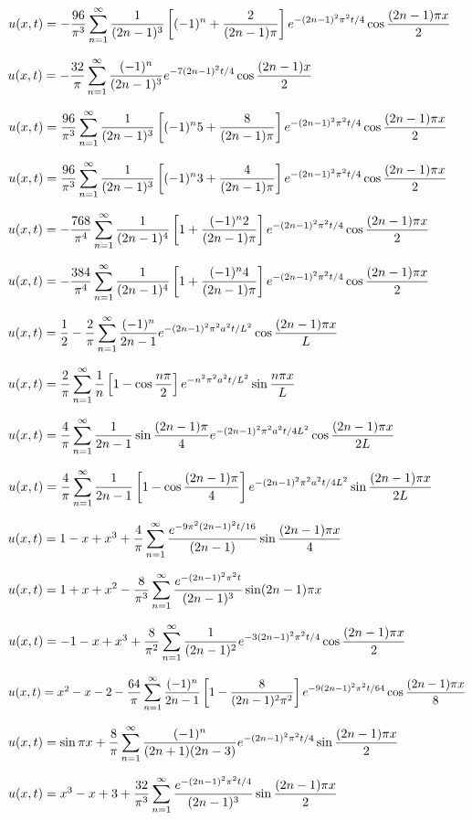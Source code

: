 $u(x,t)=-\displaystyle\frac{96}{\pi^{3}}\sum_{n=1}^{\infty}\frac{1}{(2n-1)^{3}}\left[
(-1)^{n}+\frac{2}{(2n-1)\pi}\right]e^{-(2n-1)^{2}\pi^{2}t/4}\cos\frac{(2n-1)\pi
x}{2}$

$u(x,t)=-\displaystyle
\frac{32}{\pi}\sum_{n=1}^{\infty}\frac{(-1)^{n}}{(2n-1)^{3}}e^{-7(2n-1)^{2}t/4}\cos\frac{(2n-1)x}{2}$

$u(x,t)=\displaystyle\frac{96}{\pi^{3}}\sum_{n=1}^{\infty}\frac{1}{(2n-1)^{3}}\left[
(-1)^{n}5+\frac{8}{(2n-1)\pi}\right]e^{-(2n-1)^{2}\pi^{2}t/4}\cos\frac{(2n-1)\pi
x}{2}$

$u(x,t)=\displaystyle\frac{96}{\pi^{3}}\sum_{n=1}^{\infty}\frac{1}{(2n-1)^{3}}\left[
(-1)^{n}3+\frac{4}{(2n-1)\pi}\right]e^{-(2n-1)^{2}\pi^{2}t/4}\cos\frac{(2n-1)\pi
x}{2}$

$u(x,t)=-\displaystyle\frac{768}{\pi^{4}}\sum_{n=1}^{\infty}\frac{1}{(2n-1)^{4}}\left[
1+\frac{(-1)^{n}2}{(2n-1)\pi}\right]e^{-(2n-1)^{2}\pi^{2}t/4}\cos\frac{(2n-1)\pi
x}{2}$

$u(x,t)=-\displaystyle\frac{384}{\pi^{4}}\sum_{n=1}^{\infty}\frac{1}{(2n-1)^{4}}\left[
1+\frac{(-1)^{n}4}{(2n-1)\pi}\right]e^{-(2n-1)^{2}\pi^{2}t/4}\cos\frac{(2n-1)\pi
x}{2}$

$u(x,t)=\displaystyle\frac{1}{2}-\frac{2}{\pi}\sum_{n=1}^{\infty}
\frac{(-1)^{n}}{2n-1}e^{-(2n-1)^{2}\pi^{2}a^{2}t/L^{2}}\cos\frac{(2n-1)\pi x}{L}$

$u(x,t)=\displaystyle\frac{2}{\pi}\sum_{n=1}^{\infty}\frac{1}{n}
\left[1-\cos\frac{n\pi}{2}\right]e^{-n^{2}\pi^{2}a^{2}t/L^{2}}\sin\frac{n\pi x}{L}$

$u(x,t)=\displaystyle\frac{4}{\pi}\sum_{n=1}^{\infty}\frac{1}{2n-1}\sin\frac{(2n-1)\pi}{4}
e^{-(2n-1)^{2}\pi^{2}a^{2}t/4L^{2}}\cos\frac{(2n-1)\pi x}{2L}$

$u(x,t)=\displaystyle\frac{4}{\pi}\sum_{n=1}^{\infty}\frac{1}{2n-1}
\left[1-\cos\frac{(2n-1)\pi}{4}\right]
e^{-(2n-1)^{2}\pi^{2}a^{2}t/4L^{2}}\sin\frac{(2n-1)\pi x}{2L}$

$u(x,t)=1-x+x^{3}+\displaystyle\frac{4}{\pi}\sum_{n=1}^{\infty}\frac{e^{-9\pi^{2}(2n-1)^{2}t/16}}{(2n-1)}
\sin\frac{(2n-1)\pi x}{4}$

$u(x,t)=\displaystyle1+x+x^{2}
-\displaystyle\frac{8}{\pi^{3}}\sum_{n=1}^{\infty}
\frac{e^{-(2n-1)^{2}\pi^{2}t}}{(2n-1)^{3}}
\sin(2n-1)\pi x$

$u(x,t)=-1-x+x^{3}+
\displaystyle\frac{8}{\pi^{2}}\sum_{n=1}^{\infty}\frac{1}{(2n-1)^{2}}
e^{-3(2n-1)^{2}\pi^{2}t/4}
\cos\frac{(2n-1)\pi x}{2}$

$u(x,t)=x^{2}-x-2\displaystyle-\frac{64}{\pi}\sum_{n=1}^{\infty}\frac{(-1)^{n}}{2n-1}\left[
1-\frac{8}{(2n-1)^{2}\pi^{2}}\right]e^{-9(2n-1)^{2}\pi^{2}t/64}\cos\frac{(2n-1)\pi
x}{8}$

$u(x,t)=\sin\pi x+\displaystyle{\frac{8}{\pi}\sum^{\infty}_{n=1}
\frac{(-1)^{n}}{(2n+1)(2n-3)}e^{-(2n-1)^{2}\pi^{2}t/4}\sin\frac{(2n-1)\pi x}{2}}$

$u(x,t)=x^{3}-x+3+\displaystyle\frac{32}{\pi^{3}}\sum_{n=1}^{\infty}\frac{e^{-(2n-1)^{2}\pi^{2}t/4}}{(2n-1)^{3}}\sin\frac{(2n-1)\pi x}{2}$

